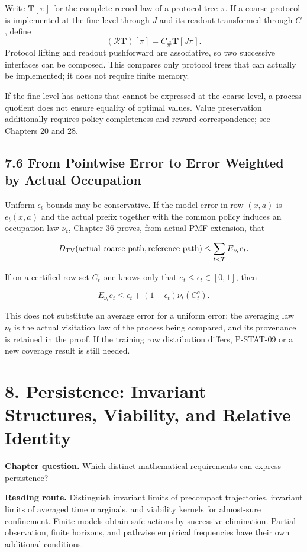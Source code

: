 \documentclass[
  english,
  11pt,
  oneside]{book}
\begin{document}
Write \(\mathbf T[\pi]\) for the complete record law of a protocol tree \(\pi\). If a coarse protocol is implemented at the fine level through \(J\) and its readout transformed through \(C\), define \[(\mathcal R\mathbf T)[\pi]=C_\#\mathbf T[J\pi].\] Protocol lifting and readout pushforward are associative, so two successive interfaces can be composed. This compares only protocol trees that can actually be implemented; it does not require finite memory.

If the fine level has actions that cannot be expressed at the coarse level, a process quotient does not ensure equality of optimal values. Value preservation additionally requires policy completeness and reward correspondence; see Chapters 20 and 28.

\section{7.6 From Pointwise Error to Error Weighted by Actual Occupation}\label{from-pointwise-error-to-error-weighted-by-actual-occupation}

Uniform \(\epsilon_t\) bounds may be conservative. If the model error in row \((x,a)\) is \(e_t(x,a)\) and the actual prefix together with the common policy induces an occupation law \(\nu_t\), Chapter 36 proves, from actual PMF extension, that

\[D_{\rm TV}(\text{actual coarse path},\text{reference path})\le\sum_{t<T}E_{\nu_t}e_t.\]

If on a certified row set \(C_t\) one knows only that \(e_t\le\epsilon_t\in[0,1]\), then

\[E_{\nu_t}e_t\le\epsilon_t+(1-\epsilon_t)\nu_t(C_t^c).\]

This does not substitute an average error for a uniform error: the averaging law \(\nu_t\) is the actual visitation law of the process being compared, and its provenance is retained in the proof. If the training row distribution differs, P-STAT-09 or a new coverage result is still needed.

\chapter{8. Persistence: Invariant Structures, Viability, and Relative Identity}\label{ch-8}

\textbf{Chapter question.} Which distinct mathematical requirements can express persistence?

\textbf{Reading route.} Distinguish invariant limits of precompact trajectories, invariant limits of averaged time marginals, and viability kernels for almost-sure confinement. Finite models obtain safe actions by successive elimination. Partial observation, finite horizons, and pathwise empirical frequencies have their own additional conditions.
\end{document}

